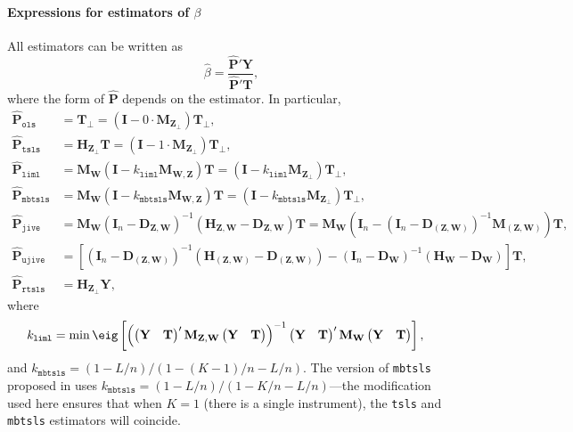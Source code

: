 \documentclass{mynotes}
\newcommand{\by}{\mathbf{Y}} %
\newcommand{\bt}{\mathbf{T}} %
\newcommand{\bz}{\mathbf{Z}} %
\newcommand{\bp}{\mathbf{P}} %
\newcommand{\bw}{\mathbf{W}} %
\newcommand{\eye}{\mathbf{I}} %
\newcommand{\Hm}[1]{\mathbf{H}_{#1}} %
\newcommand{\Dm}[1]{\mathbf{D}_{#1}} %
\newcommand{\Mm}[1]{\mathbf{M}_{#1}} %
\begin{document}
\paragraph{Expressions for estimators of $\beta$}
All estimators can be written as
\begin{equation}\label{eq:hatbeta}
  \hat{\beta}=\frac{\hat{\bp}'\by}{\hat{\bp}'\bt},
\end{equation}
where the form of $\hat{\bp}$ depends on the estimator. In particular,
\begin{align*}
  \hat{\bp}_{\mathtt{ols}}&=\bt_{\perp}=(\eye-0\cdot \Mm{\bz_{\perp}})\bt_{\perp} ,\\
  \hat{\bp}_{\mathtt{tsls}}&=\Hm{\bz_{\perp}}\bt=(\eye-1\cdot \Mm{\bz_{\perp}})\bt_{\perp},\\
  \hat{\bp}_{\mathtt{liml}}&=\Mm{\bw}(\eye-k_{\mathtt{liml}}\Mm{\bw,\bz})\bt=
  (\eye-k_{\mathtt{liml}}\Mm{\bz_{\perp}})\bt_{\perp} ,\\
  \hat{\bp}_{\mathtt{mbtsls}}&=\Mm{\bw}(\eye-k_{\mathtt{mbtsls}}\Mm{\bw,\bz})\bt=
  (\eye-k_{\mathtt{mbtsls}}\Mm{\bz_{\perp}})\bt_{\perp},\\
  \hat{\bp}_{\mathtt{jive}}&=\Mm{\bw}(\eye_{n}-\Dm{\bz,\bw})^{-1}(\Hm{\bz,\bw}-\Dm{\bz,\bw})\bt=
  \Mm{\bw}(\eye_{n}-(\eye_{n}-\Dm{(\bz,\bw)})^{-1}\Mm{(\bz,\bw)})\bt,\\
  \hat{\bp}_{\mathtt{ujive}}&=\left[(\eye_{n}-\Dm{(\bz,\bw)})^{-1}(\Hm{(\bz,\bw)}-\Dm{(\bz,\bw)})
    -(\eye_{n}-\Dm{\bw})^{-1}(\Hm{\bw}-\Dm{\bw})\right]\bt,\\
  \hat{\bp}_{\mathtt{rtsls}}&=\Hm{\bz_{\perp}}\by,
\end{align*}
where
\begin{align}\label{eq:k-liml}
  k_{\mathtt{liml}}&=\min\eig \left[\left( \begin{pmatrix} \by&\bt
      \end{pmatrix}'\Mm{\bz,\bw} \begin{pmatrix} \by&\bt
      \end{pmatrix}\right)^{-1}
    \begin{pmatrix}
      \by&\bt
    \end{pmatrix}' \Mm{\bw}\begin{pmatrix} \by&\bt
    \end{pmatrix}\right],
\end{align}
and $k_{\mathtt{mbtsls}}=(1-L/n)/(1-(K - 1)/n-L/n)$. The version of
\texttt{mbtsls} proposed in \citet{kcfgi11} uses
$k_{\mathtt{mbtsls}}=(1-L/n)/(1-K/n-L/n)$---the modification used here ensures
that when $K=1$ (there is a single instrument), the \texttt{tsls} and
\texttt{mbtsls} estimators will coincide.
\end{document}
